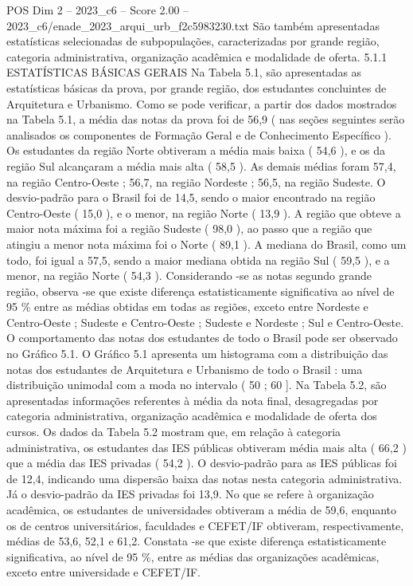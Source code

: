 \begin{textsample}{POS Dim 2 – 2023\_c6 – Score 2.00 – 2023\_c6/enade\_2023\_arqui\_urb\_f2c5983230.txt}
São também apresentadas estatísticas selecionadas de subpopulações, caracterizadas por grande região, categoria administrativa, organização acadêmica e modalidade de oferta. 5.1.1 ESTATÍSTICAS BÁSICAS GERAIS Na Tabela 5.1, são apresentadas as estatísticas básicas da prova, por grande região, dos estudantes concluintes de Arquitetura e Urbanismo.
Como se pode verificar, a partir dos dados mostrados na Tabela 5.1, a média das notas da prova foi de 56,9 ( nas seções seguintes serão analisados os componentes de Formação Geral e de Conhecimento Específico ).
Os estudantes da região Norte obtiveram a média mais baixa ( 54,6 ), e os da região Sul alcançaram a média mais alta ( 58,5 ).
As demais médias foram 57,4, na região Centro-Oeste ; 56,7, na região Nordeste ; 56,5, na região Sudeste.
O desvio-padrão para o Brasil foi de 14,5, sendo o maior encontrado na região Centro-Oeste ( 15,0 ), e o menor, na região Norte ( 13,9 ).
A região que obteve a maior nota máxima foi a região Sudeste ( 98,0 ), ao passo que a região que atingiu a menor nota máxima foi o Norte ( 89,1 ).
A mediana do Brasil, como um todo, foi igual a 57,5, sendo a maior mediana obtida na região Sul ( 59,5 ), e a menor, na região Norte ( 54,3 ).
Considerando -se as notas segundo grande região, observa -se que existe diferença estatisticamente significativa ao nível de 95 \% entre as médias obtidas em todas as regiões, exceto entre Nordeste e Centro-Oeste ; Sudeste e Centro-Oeste ; Sudeste e Nordeste ; Sul e Centro-Oeste.
O comportamento das notas dos estudantes de todo o Brasil pode ser observado no Gráfico 5.1.
O Gráfico 5.1 apresenta um histograma com a distribuição das notas dos estudantes de Arquitetura e Urbanismo de todo o Brasil : uma distribuição unimodal com a moda no intervalo ( 50 ; 60 ].
Na Tabela 5.2, são apresentadas informações referentes à média da nota final, desagregadas por categoria administrativa, organização acadêmica e modalidade de oferta dos cursos.
Os dados da Tabela 5.2 mostram que, em relação à categoria administrativa, os estudantes das IES públicas obtiveram média mais alta ( 66,2 ) que a média das IES privadas ( 54,2 ).
O desvio-padrão para as IES públicas foi de 12,4, indicando uma dispersão baixa das notas nesta categoria administrativa.
Já o desvio-padrão da IES privadas foi 13,9.
No que se refere à organização acadêmica, os estudantes de universidades obtiveram a média de 59,6, enquanto os de centros universitários, faculdades e CEFET/IF obtiveram, respectivamente, médias de 53,6, 52,1 e 61,2.
Constata -se que existe diferença estatisticamente significativa, ao nível de 95 \%, entre as médias das organizações acadêmicas, exceto entre universidade e CEFET/IF.

\end{textsample}
